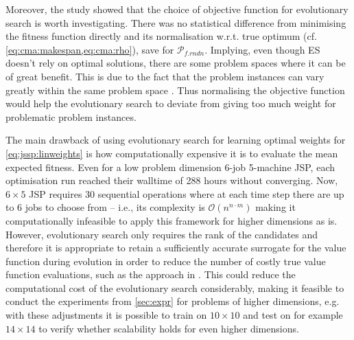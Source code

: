 \documentclass[graybox]{svmult}
\begin{document}
Moreover, the study showed that the choice of objective function  for 
evolutionary search is worth investigating. There was no statistical difference 
from minimising the fitness function directly and its normalisation w.r.t. true 
optimum (cf. \cref{eq:cma:makespan,eq:cma:rho}), save for 
$\mathcal{P}_{f.rndn}$. Implying, even though ES doesn't rely on optimal 
solutions, there are some problem spaces where it can be of great benefit. This 
is due to the fact that the problem instances can vary greatly within the same 
problem space \cite{InRu12}. Thus normalising the objective function would help 
the evolutionary search to deviate from giving too much weight for 
problematic problem instances.

The main drawback of using evolutionary search for learning optimal weights for 
\cref{eq:jssp:linweights} is how computationally expensive it is to evaluate 
the mean expected fitness. Even for a low problem dimension 6-job 5-machine 
JSP, each optimisation run reached their walltime of 288 hours without 
converging. Now, $6\times5$ JSP requires 30 sequential operations where at each 
time step there are up to $6$ jobs to choose from -- i.e., its complexity is 
$\mathcal{O}(n^{n\cdot m})$ making it computationally infeasible to apply this 
framework for higher dimensions as is. 
However, evolutionary search only requires the rank of the candidates and 
therefore it is appropriate to retain a sufficiently accurate surrogate for the 
value function during evolution in order to reduce the number of costly true 
value function evaluations, such as the approach in \cite{InRu11b}. This could 
reduce the computational cost of the evolutionary search considerably, making 
it feasible to conduct the experiments from \cref{sec:expr} for problems of 
higher dimensions, e.g. with these adjustments it is possible to train on 
$10\times10$ and test on for example $14\times14$ to verify whether scalability 
holds for even higher dimensions.  
\end{document}
